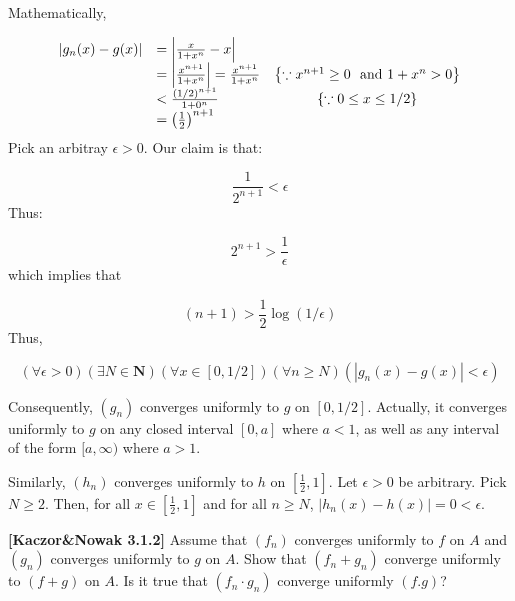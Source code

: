 \documentclass[10pt]{article}
\begin{document}
Mathematically,


\begin{equation*}
\begin{array}{ c l c }
|g_{n}( x) -g( x) | & =\left| \frac{x}{1+x^{n}} -x\right|  & \\
 & =\left| \frac{x^{n+1}}{1+x^{n}}\right| =\frac{x^{n+1}}{1+x^{n}} & \left\{\because x^{n+1} \geq 0\ \ \text{and } 1+x^{n}  >0\right\}\\
 & < \frac{( 1/2)^{n+1}}{1+0^{n}} & \{\because 0\leq x\leq 1/2\}\\
 & =\left(\frac{1}{2}\right)^{n+1} & 
\end{array}
\end{equation*}
Pick an arbitray $\displaystyle \epsilon  >0$. Our claim is that:


\begin{equation*}
\frac{1}{2^{n+1}} < \epsilon 
\end{equation*}
Thus:


\begin{equation*}
2^{n+1}  >\frac{1}{\epsilon }
\end{equation*}
which implies that


\begin{equation*}
( n+1)  >\frac{1}{2}\log( 1/\epsilon )
\end{equation*}
Thus,


\begin{equation*}
( \forall \epsilon  >0)( \exists N\in \mathbf{N})( \forall x\in [ 0,1/2])( \forall n\geq N)( |g_{n}( x) -g( x) |< \epsilon )
\end{equation*}


Consequently, $\displaystyle ( g_{n})$ converges uniformly to $\displaystyle g$ on $\displaystyle [ 0,1/2]$. Actually, it converges uniformly to $\displaystyle g$ on any closed interval $\displaystyle [ 0,a]$ where $\displaystyle a< 1$, as well as any interval of the form $\displaystyle [ a,\infty )$ where $\displaystyle a >1$.



Similarly, $\displaystyle ( h_{n})$ converges uniformly to $\displaystyle h$ on $\displaystyle \left[\frac{1}{2} ,1\right]$. Let $\displaystyle \epsilon  >0$ be arbitrary. Pick $\displaystyle N\geq 2$. Then, for all $\displaystyle x\in \left[\frac{1}{2} ,1\right]$ and for all $\displaystyle n\geq N$, $\displaystyle |h_{n}( x) -h( x) |=0< \epsilon $. 



\textbf{[Kaczor\&Nowak 3.1.2]} Assume that $\displaystyle ( f_{n})$ converges uniformly to $\displaystyle f$ on $\displaystyle A$ and $\displaystyle ( g_{n})$ converges uniformly to $\displaystyle g$ on $\displaystyle A$. Show that $\displaystyle ( f_{n} +g_{n})$ converge uniformly to $\displaystyle ( f+g)$ on $\displaystyle A$. Is it true that $\displaystyle ( f_{n} \cdot g_{n})$ converge uniformly $\displaystyle ( f.g)$?
\end{document}
